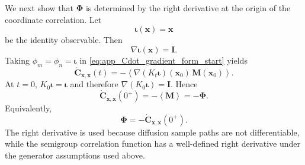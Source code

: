 \documentclass[11pt,twoside,fleqn]{article}
\begin{document}
We next show that $\bm{\Phi}$ is determined by the right derivative at the origin of the coordinate correlation. Let
\begin{equation}
    \bm{\iota}(\bm{x})=\bm{x}
    \label{eq:app_coordinate_observable_iota}
\end{equation}
be the identity observable. Then
\begin{equation}
    \nabla\bm{\iota}(\bm{x})=\bm{I}.
    \label{eq:app_coordinate_gradient_identity}
\end{equation}
Taking $\phi_m=\phi_n=\bm{\iota}$ in \eqref{eq:app_Cdot_gradient_form_start} yields
\begin{equation}
    \dot{\bm{C}}_{\bm{x},\bm{x}}(t)
    =
    -
    \left\langle
        \nabla(K_t\bm{\iota})(\bm{x}_0)\,
        \bm{M}(\bm{x}_0)
    \right\rangle .
    \label{eq:app_coordinate_Cdot_general}
\end{equation}
At $t=0$, $K_0\bm{\iota}=\bm{\iota}$ and therefore $\nabla(K_0\bm{\iota})=\bm{I}$. Hence
\begin{equation}
    \dot{\bm{C}}_{\bm{x},\bm{x}}(0^+)
    =
    -
    \left\langle
        \bm{M}
    \right\rangle
    =
    -
    \bm{\Phi}.
    \label{eq:app_Cdot_zero_Phi}
\end{equation}
Equivalently,
\begin{equation}
    \bm{\Phi}
    =
    -
    \dot{\bm{C}}_{\bm{x},\bm{x}}(0^+).
    \label{eq:app_Phi_from_Cdot_zero}
\end{equation}
The right derivative is used because diffusion sample paths are not differentiable, while the semigroup correlation function has a well-defined right derivative under the generator assumptions used above.
\end{document}

